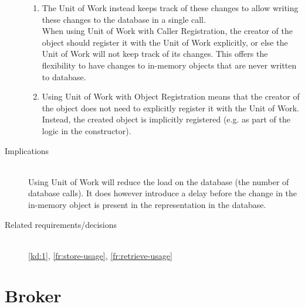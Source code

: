 \begin{description}
\begin{enumerate}
\item The Unit of Work instead keeps track of these changes to allow writing these changes to the database in a single call.\\ When using Unit of Work with Caller Registration, the creator of the object should register it with the Unit of Work explicitly, or else the Unit of Work will not keep track of its changes. This offers the flexibility to have changes to in-memory objects that are never written to database. 

\item Using Unit of Work with Object Registration means that the creator of the object does not need to explicitly register it with the Unit of Work. Instead, the created object is implicitly registered (e.g. as part of the logic in the constructor). 
\end{enumerate}

\item [Implications]~\\
Using Unit of Work will reduce the load on the database (the number of database calls). It does however introduce a delay before the change in the in-memory object is present in the representation in the database.

\item [Related requirements/decisions]~\\
\ref{kd:1}, \ref{fr:store-usage}, \ref{fr:retrieve-usage}

\end{description}

\section{Broker}

